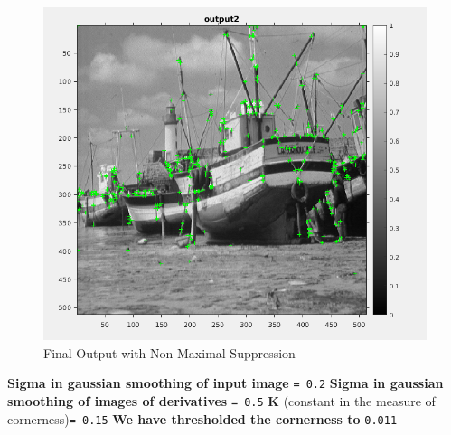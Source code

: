 \documentclass{article}
\begin{document}
\newpage


\begin{figure}[h!]
  \includegraphics[width=\linewidth]{with_non_maximal.png}
  \caption{Final Output with Non-Maximal Suppression}
  \label{fig:result2}
\end{figure}


\newpage

\textbf{Sigma in gaussian smoothing of input image } \texttt{= 0.2} \newline
\textbf{Sigma in gaussian smoothing of images of derivatives } \texttt{= 0.5} \newline
\textbf{K }(constant  in the measure of cornerness)\texttt{= 0.15} \newline
\textbf{We have thresholded the cornerness to} \texttt{0.011}
\end{document}
